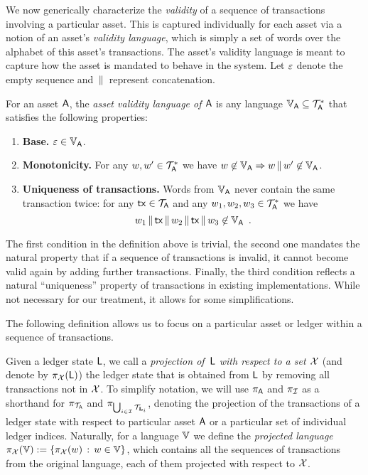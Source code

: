 We now generically characterize the \emph{validity} of a sequence of
transactions involving a particular asset. This is captured individually for each
asset via a notion of an asset's \emph{validity language},
which is simply  a set of words over the alphabet of this asset's transactions.
The asset's validity language is meant to capture how the asset is mandated to
behave in the system.
Let $\varepsilon$ denote the empty sequence and $\,\|\,$ represent
concatenation.

\begin{definition}
  For an asset $\mathsf{A}$,
  the \emph{asset validity language of $\mathsf{A}$}
  is any language
  $\mathbb{V}_{\mathsf{A}}\subseteq\mathcal{T}_{\mathsf{A}}^*$
  that satisfies the following properties:
  \begin{enumerate}
    \item \textbf{Base.}
      $\varepsilon\in\mathbb{V}_{\mathsf{A}}$.
    \item \textbf{Monotonicity.}
      For any $w,w'\in\mathcal{T}_{\mathsf{A}}^*$ we have
      $
      w\not\in\mathbb{V}_{\mathsf{A}}
      \Rightarrow
      w\,\|\, w'\not\in\mathbb{V}_{\mathsf{A}}
      $.
    \item \textbf{Uniqueness of transactions.}
      Words from $\mathbb{V}_{\mathsf{A}}$ never contain the same transaction twice:
      for any $\mathsf{tx}\in\mathcal{T}_{\mathsf{A}}$ and any $w_1,w_2,w_3\in\mathcal{T}_{\mathsf{A}}^*$ we
      have \[
      w_1\,\|\,\mathsf{tx}\,\|\, w_2\,\|\,\mathsf{tx}\,\|\, w_3\not\in\mathbb{V}_{\mathsf{A}}
      \,~.
      \]
  \end{enumerate}
\end{definition}

The first condition in the definition above is trivial, the second one mandates
the natural property that if a sequence of transactions is invalid, it cannot
become valid again by adding further transactions. Finally, the third condition
reflects a natural ``uniqueness'' property of transactions in existing
implementations. While not necessary for our treatment, it allows for some
simplifications.

The following definition allows us to focus on a particular asset or ledger
within a sequence of transactions.

\begin{definition}
  Given a ledger state $\mathsf{L}$, we call a
  \emph{projection of~$\mathsf{L}$ with respect to a set $\mathcal{X}$}
  (and denote by $\pi_{\mathcal{X}}(\mathsf{L})$) the ledger state that is obtained from
  $\mathsf{L}$ by removing all transactions not in $\mathcal{X}$. To simplify
  notation, we will use $\pi_{\mathsf{A}}$ and $\pi_{\mathcal{I}}$ as a shorthand for
  $\pi_{\mathcal{T}_{\mathsf{A}}}$ and $\pi_{\bigcup_{i\in\mathcal{I}} \mathcal{T}_{\mathbf{L}_i}}$,
  denoting the projection of the transactions of a ledger state with respect to
  particular asset $\mathsf{A}$ or a particular set of individual ledger
  indices.
  Naturally, for a language $\mathbb{V}$ we define the
  \emph{projected language}
  $\pi_{\mathcal{X}}(\mathbb{V}):=\left\{ \pi_{\mathcal{X}}(w) \,:\, w\in\mathbb{V} \right\}$, which
  contains all the sequences of transactions from the original language,
  each of them projected with respect to $\mathcal{X}$.
\end{definition}

